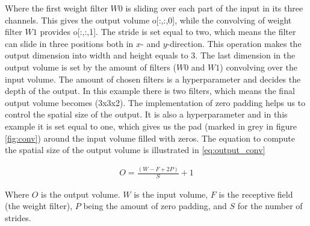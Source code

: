\documentclass[USenglish]{ifimaster}  %
\begin{document}
Where the first weight filter $W0$ is sliding over each part of the input in its three channels. This gives the output volume o[:,:,0], while the convolving of weight filter $W1$ provides o[:,:,1]. The stride is set equal to two, which means the filter can slide in three positions both in $x$- and $y$-direction. This operation makes the output dimension into width and height equals to 3. The last dimension in the output volume is set by the amount of filters ($W0$ and $W1$) convolving over the input volume. The amount of chosen filters is a hyperparameter and decides the depth of the output. In this example there is two filters, which means the final output volume becomes (3x3x2). 
The implementation of zero padding helps us to control the spatial size of the output. It is also a hyperparameter and in this example it is set equal to one, which gives us the pad (marked in grey in figure \ref{fig:conv}) around the input volume filled with zeros. 
\newline
\newline
The equation to compute the spatial size of the output volume is illustrated in \ref{eq:output_conv}

\begin{equation}\label{eq:output_conv}
\begin{aligned}
O = \frac{(W - F + 2P)}{S}+1
\end{aligned}
\end{equation}

Where $O$ is the output volume. $W$ is the input volume, $F$ is the receptive field (the weight filter), $P$ being the amount of zero padding, and $S$ for the number of strides.
 
\end{document}
